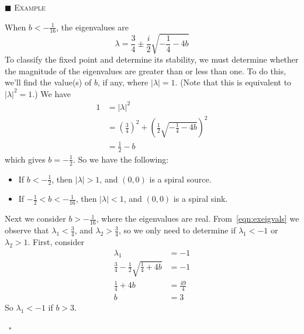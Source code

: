 \documentclass[reqno]{immbook}
\numberwithin{equation}{chapter}
\numberwithin{question}{section}
\numberwithin{theorem}{chapter}
\numberwithin{figure}{chapter}
\theoremstyle{definition}
\newenvironment{xexample}%
{%

\medskip\noindent\addtocounter{example}{1}$\blacksquare$ \textsc{Example \theexample}\hspace*{1em}%
}%
{%
~\hfill$\square$

\medskip
}
\begin{document}
\begin{xexample}
When $b < -\frac{1}{16}$, the eigenvalues are
\begin{equation}
   \lambda = \frac{3}{4} \pm \frac{i}{2}\sqrt{-\frac{1}{4}-4b}
\end{equation}
To classify the fixed point and determine its stability,
we must determine whether the magnitude of the eigenvalues
are greater than or less than one.  To do this, we'll find the
value(s) of $b$, if any, where $|\lambda| = 1$.
(Note that this is equivalent to $|\lambda|^2 = 1$.)
We have
\begin{equation}
\begin{split}
  1 & = |\lambda|^2 \\
    & = \left(\frac{3}{4}\right)^2 + \left(\frac{1}{2}\sqrt{-\frac{1}{4}-4b} \right)^2 \\
    & = \frac{1}{2} - b
\end{split}
\end{equation}
which gives $b=-\frac{1}{2}$.
So we have the following:
\begin{itemize}
\item
If $b < -\frac{1}{2}$, then $|\lambda| > 1$, and $(0,0)$ is a spiral source.
\item
If $-\frac{1}{2} < b < -\frac{1}{16}$, then $|\lambda| < 1$, and $(0,0)$
is a spiral sink.
\end{itemize}
Next we consider $b > -\frac{1}{16}$, where the eigenvalues are real.
From~\eqref{eqn:exeigvals} we observe that $\lambda_1 < \frac{3}{4}$,
and $\lambda_2 > \frac{3}{4}$, so we only need to determine
if $\lambda_1 < -1$ or  $\lambda_2 > 1$.
First, consider
\begin{equation}
\begin{split}
   \lambda_1 & = -1 \\
   \frac{3}{4} - \frac{1}{2} \sqrt{\frac{1}{4}+4b} & = -1 \\
   \frac{1}{4}+4b & = \frac{49}{4} \\
   b & = 3
\end{split}
\end{equation}
So $\lambda_1 < -1$ if $b > 3$.


\end{xexample}
\end{document}
